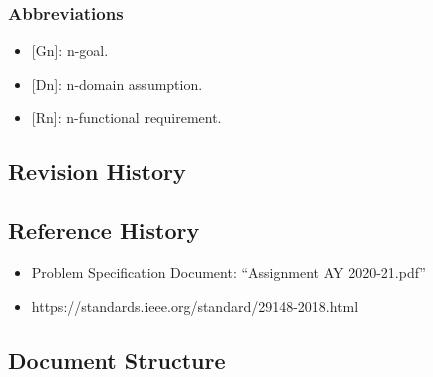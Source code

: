 \subsubsection{Abbreviations}
\begin{itemize}
    \item {[Gn]}: n-goal.
    \item {[Dn]}: n-domain assumption.
    \item {[Rn]}: n-functional requirement.
\end{itemize}

\subsection{Revision History}
\subsection{Reference History}
\begin{itemize}
    \item Problem Specification Document: ``Assignment AY 2020-21.pdf''
    \item https://standards.ieee.org/standard/29148-2018.html
\end{itemize}
\subsection{Document Structure}
